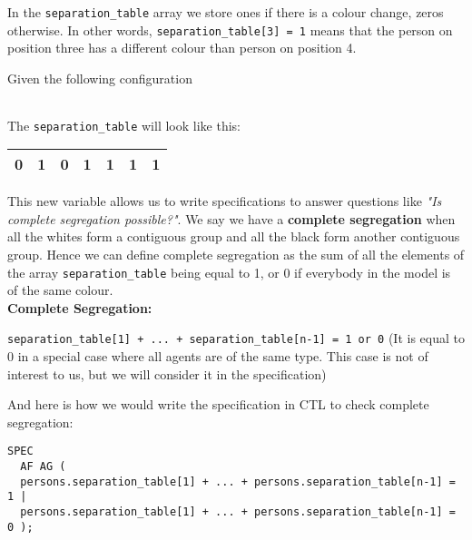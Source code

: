 \documentclass[../main.tex]{subfiles}
\begin{document}
 In the \verb|separation_table| array we store ones if there is a colour change, zeros otherwise. In other words, \verb|separation_table[3] = 1| means that the person on position three has a different colour than person on position 4.
 
 Given the following configuration
 \begin{table}[H]
\begin{center}
{\begin{tabular}{| c |c| c| c| c |c| c |c|}
\hline
\z &\z &\x &\x  &\z &\x &\z & \x \\
 \hline
\end{tabular}}
\end{center}
\end{table}

The \verb|separation_table| will look like this:
 \begin{table}[H]
\begin{center}
{\begin{tabular}{| c |c| c| c| c |c| c |}
\hline
0 & 1 & 0 & 1  & 1 & 1 & 1  \\
 \hline
\end{tabular}}
\end{center}
\end{table}

This new variable allows us to write specifications to answer questions like \textit{"Is complete segregation possible?"}. We say we have a \textbf{complete segregation} when all the whites form a contiguous group and all the black form another contiguous group. Hence we can define complete segregation as the sum of all the elements of the array \verb|separation_table| being equal to 1, or 0 if everybody in the model is of the same colour. \\


\textbf{Complete Segregation:}

\verb|separation_table[1] + ... + separation_table[n-1] = 1 or 0| (It is equal to 0 in a special case where all agents are of the same type. This case is not of interest to us, but we will consider it in the specification)

 And here is how we would write the specification in CTL to check complete segregation:
 \begin{lstlisting}
SPEC
  AF AG (
  persons.separation_table[1] + ... + persons.separation_table[n-1] = 1 |
  persons.separation_table[1] + ... + persons.separation_table[n-1] = 0 );
 \end{lstlisting}
\end{document}
